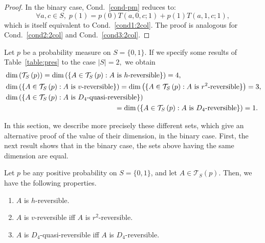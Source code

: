 \documentclass[10pt]{amsart}
\theoremstyle{definition}\newtheorem{defi}[theo]{Definition}\newtheorem{rema}[theo]{Remark}\newtheorem{exam}[theo]{Example}\newtheorem{exem}[theo]{Example}\newtheorem{nota}[theo]{Notation}
\newcounter{a}
\newcommand{\Cond}{Cond.}
\newcommand{\triang}[2]{\mathcal{T}_{#1} \left(#2 \right)}
\let\oldforall\forall
\renewcommand*{\forall}{\mathrel{\oldforall}}
\begin{document}
\begin{proof}
In the binary case, \Cond~\ref{cond-pm} reduces to: 
\[
\forall a,c\in S, \; p(1)=p(0)T(a,0,c;1)+p(1)T(a,1,c;1),
\]
which is itself equivalent to \Cond~\ref{cond1:2col}. The proof is analogous for \Cond~\ref{cond2:2col} and \Cond~\ref{cond3:2col}.
\end{proof}

Let $p$ be a probability measure on $S=\{0,1\}$. If we specify some results of Table~\ref{table:pres} to the case $|S|=2,$ we obtain
\begin{align*}
& \dim \left(\triang{S}{p} \right) = \dim \left(\{A \in \triang{S}{p} : A \text{ is $h$-reversible}\} \right) = 4,\\
& \dim \left(\{A \in \triang{S}{p} : A \text{ is $v$-reversible}\} \right) = \dim \left(\{A \in \triang{S}{p} : A \text{ is $r^2$-reversible}\} \right) = 3,\\
& \dim \left(\{A \in \triang{S}{p} : A \text{ is $D_4$-quasi-reversible}\} \right) \\
&\mkern 280mu =\dim \left(\{A \in \triang{S}{p} : A \text{ is $D_4$-reversible}\} \right) = 1.
\end{align*}

In this section, we describe more precisely these different sets, which give an alternative proof of the value of their dimension, in the binary case. First, the next result shows that in the binary case, the sets above having the same dimension are equal.

\begin{prop}
Let $p$ be any positive probability on $S=\{0,1\}$, and let $A\in\triang{S}{p}$. Then, we have the following properties.
\begin{enumerate}
\item \label{list7.2.1}$A$ is $h$-reversible.
\item \label{list7.2.2}$A$ is $v$-reversible iff $A$ is $r^2$-reversible.
\item \label{list7.2.3}$A$ is $D_4$-quasi-reversible iff $A$ is $D_4$-reversible.
\end{enumerate}
\end{prop}
\end{document}
